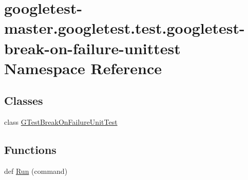 \hypertarget{namespacegoogletest-master_1_1googletest_1_1test_1_1googletest-break-on-failure-unittest}{}\section{googletest-\/master.googletest.\+test.\+googletest-\/break-\/on-\/failure-\/unittest Namespace Reference}
\label{namespacegoogletest-master_1_1googletest_1_1test_1_1googletest-break-on-failure-unittest}
\subsection*{Classes}
\begin{DoxyCompactItemize}
\item 
class \mbox{\hyperlink{classgoogletest-master_1_1googletest_1_1test_1_1googletest-break-on-failure-unittest_1_1_g_test_break_on_failure_unit_test}{G\+Test\+Break\+On\+Failure\+Unit\+Test}}
\end{DoxyCompactItemize}
\subsection*{Functions}
\begin{DoxyCompactItemize}
\item 
def \mbox{\hyperlink{namespacegoogletest-master_1_1googletest_1_1test_1_1googletest-break-on-failure-unittest_a19acc4510ca9d815da7aecb0bd331279}{Run}} (command)
\end{DoxyCompactItemize}
